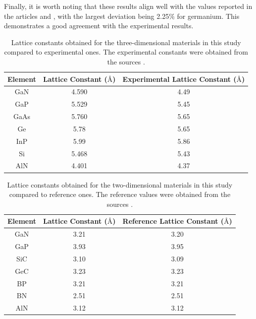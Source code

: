 Finally, it is worth noting that these results align well with the values reported in the articles \cite{Matusalem_2020} and \cite{PhysRevB.97.045426}, with the largest deviation being 2.25\% for germanium. This demonstrates a good agreement with the experimental results.

\begin{table}[h]
    \small
    \setlength{\tabcolsep}{5pt} %
    \renewcommand{\arraystretch}{1.2} %
    \centering
    \caption{Lattice constants obtained for the three-dimensional materials in this study compared to experimental ones. The experimental constants were obtained from the sources \cite{Matusalem_2020} \cite{article} \cite{alma991022421219705251}.}
    \label{tab:lt_ct_3d}
    \begin{tabular}{c c c}
        \hline
        \hline
        \textbf{Element} & \textbf{Lattice Constant ($\text{\AA}$)} &\textbf{Experimental Lattice Constant ($\text{\AA}$)}  \\
        \hline
        GaN & 4.590 & 4.49\\
        GaP & 5.529 & 5.45\\
        GaAs & 5.760 & 5.65\\
        Ge & 5.78  &5.65\\
        InP & 5.99 & 5.86\\
        Si & 5.468  &  5.43\\
        AlN & 4.401 & 4.37 \\
        \hline
        \hline
    \end{tabular}
\end{table}

\begin{table}[h]
    \small
    \setlength{\tabcolsep}{5pt} %
    \renewcommand{\arraystretch}{1.2} %
    \centering
    \caption{Lattice constants obtained for the two-dimensional materials in this study compared to reference ones. The reference values were obtained from the sources \cite{PhysRevB.97.045426}.}
    \label{tab:lt_ct_2d}
    \begin{tabular}{c c c}
        \hline
        \hline
        \textbf{Element} & \textbf{Lattice Constant ($\text{\AA}$)} & \textbf{Reference Lattice Constant ($\text{\AA}$)}  \\
        \hline
        GaN & 3.21 & 3.20\\
        GaP & 3.93 & 3.95 \\
        SiC & 3.10 & 3.09 \\
        GeC & 3.23 & 3.23 \\
        BP & 3.21 &  3.21\\
        BN & 2.51 &  2.51\\
        AlN & 3.12 &  3.12 \\
        \hline
        \hline
    \end{tabular}
\end{table}

